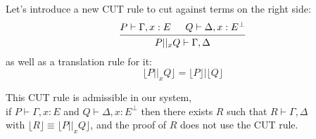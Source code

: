 \documentclass[a4paper,12pt]{article}
\begin{document}
Let's introduce a new CUT rule to cut against terms on the right side:
\[\begin{prooftree}\hypo{P \vdash \Gamma,x:E}
	\hypo{Q \vdash \Delta,x:E^\bot}
	\infer2{P||_xQ \vdash \Gamma,\Delta}\end{prooftree}\]
as well as a translation rule for it:
\[ \lfloor P||_xQ \rfloor = \lfloor P \rfloor | \lfloor Q \rfloor \]
\newpage
\begin{proposition}
This CUT rule is admissible in our system, \ie\\
if $P \vdash \Gamma,x:E$ and $Q \vdash \Delta,x:E^\bot$ then there exists $R$ such that $R \vdash \Gamma,\Delta$\\
with $\lfloor R \rfloor \equiv \lfloor P||_xQ \rfloor$, and the proof of $R$ does not use the CUT rule.
\end{proposition}
\end{document}
